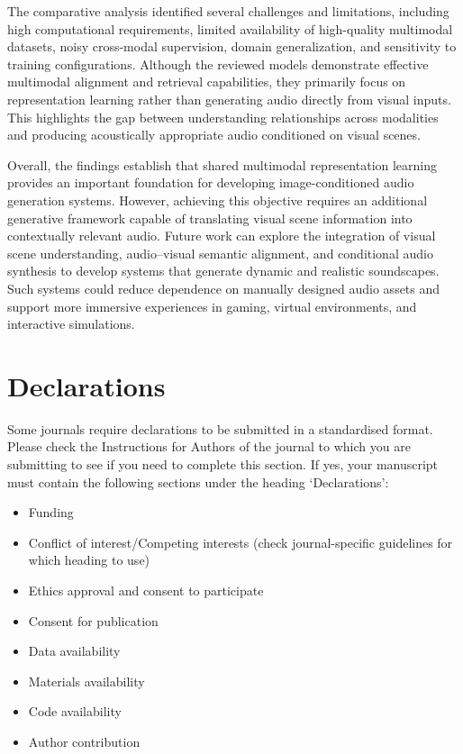 \documentclass[pdflatex,sn-mathphys-num]{sn-jnl}%
\theoremstyle{thmstyleone}%
\theoremstyle{thmstyletwo}%
\theoremstyle{thmstylethree}%
\begin{document}
The comparative analysis identified several challenges and limitations, including high computational requirements, limited availability of high-quality multimodal datasets, noisy cross-modal supervision, domain generalization, and sensitivity to training configurations. Although the reviewed models demonstrate effective multimodal alignment and retrieval capabilities, they primarily focus on representation learning rather than generating audio directly from visual inputs. This highlights the gap between understanding relationships across modalities and producing acoustically appropriate audio conditioned on visual scenes.

Overall, the findings establish that shared multimodal representation learning provides an important foundation for developing image-conditioned audio generation systems. However, achieving this objective requires an additional generative framework capable of translating visual scene information into contextually relevant audio. Future work can explore the integration of visual scene understanding, audio--visual semantic alignment, and conditional audio synthesis to develop systems that generate dynamic and realistic soundscapes. Such systems could reduce dependence on manually designed audio assets and support more immersive experiences in gaming, virtual environments, and interactive simulations.


\section*{Declarations}

Some journals require declarations to be submitted in a standardised format. Please check the Instructions for Authors of the journal to which you are submitting to see if you need to complete this section. If yes, your manuscript must contain the following sections under the heading `Declarations':

\begin{itemize}
\item Funding
\item Conflict of interest/Competing interests (check journal-specific guidelines for which heading to use)
\item Ethics approval and consent to participate
\item Consent for publication
\item Data availability 
\item Materials availability
\item Code availability 
\item Author contribution
\end{itemize}
\end{document}
